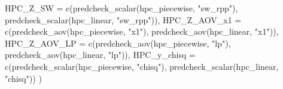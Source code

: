 \documentclass[
  english,
  letterpaper,
  DIV=11,
  numbers=noendperiod]{scrartcl}
\newenvironment{Shaded}{\begin{snugshade}}{\end{snugshade}}
\newcommand{\AttributeTok}[1]{\textcolor[rgb]{0.40,0.45,0.13}{#1}}
\newcommand{\FunctionTok}[1]{\textcolor[rgb]{0.28,0.35,0.67}{#1}}
\newcommand{\NormalTok}[1]{\textcolor[rgb]{0.00,0.23,0.31}{#1}}
\newcommand{\StringTok}[1]{\textcolor[rgb]{0.13,0.47,0.30}{#1}}
\begin{document}
\begin{Shaded}
\begin{Highlighting}[]
  \AttributeTok{HPC\_Z\_SW =} \FunctionTok{c}\NormalTok{(}\FunctionTok{predcheck\_scalar}\NormalTok{(hpc\_piecewise, }\StringTok{"sw\_rpp"}\NormalTok{), }\FunctionTok{predcheck\_scalar}\NormalTok{(hpc\_linear, }\StringTok{"sw\_rpp"}\NormalTok{)),}
  \AttributeTok{HPC\_Z\_AOV\_x1 =} \FunctionTok{c}\NormalTok{(}\FunctionTok{predcheck\_aov}\NormalTok{(hpc\_piecewise, }\StringTok{"x1"}\NormalTok{), }\FunctionTok{predcheck\_aov}\NormalTok{(hpc\_linear, }\StringTok{"x1"}\NormalTok{)),}
  \AttributeTok{HPC\_Z\_AOV\_LP =} \FunctionTok{c}\NormalTok{(}\FunctionTok{predcheck\_aov}\NormalTok{(hpc\_piecewise, }\StringTok{"lp"}\NormalTok{), }\FunctionTok{predcheck\_aov}\NormalTok{(hpc\_linear, }\StringTok{"lp"}\NormalTok{)),}
  \AttributeTok{HPC\_y\_chisq =} \FunctionTok{c}\NormalTok{(}\FunctionTok{predcheck\_scalar}\NormalTok{(hpc\_piecewise, }\StringTok{"chisq"}\NormalTok{), }\FunctionTok{predcheck\_scalar}\NormalTok{(hpc\_linear, }\StringTok{"chisq"}\NormalTok{))}
\NormalTok{)}


\end{Highlighting}
\end{Shaded}
\end{document}
